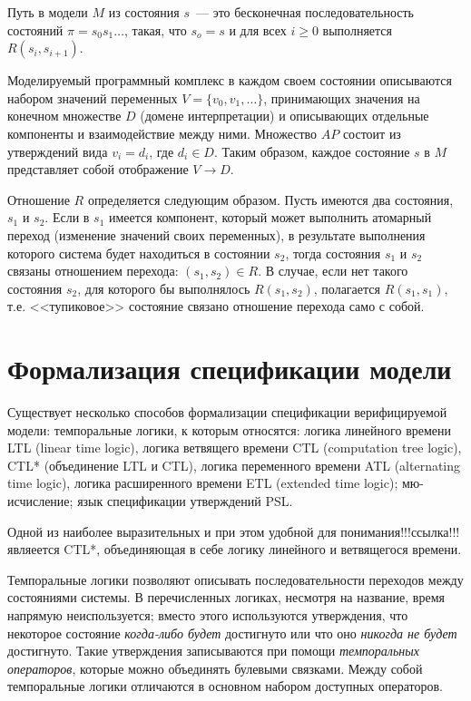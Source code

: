 \documentclass[a4paper,notitlepage,14pt]{article}
\begin{document}
Путь в модели $M$ из состояния $s$~--- это бесконечная последовательность состояний $\pi =
s_0 s_1 \ldots$, такая, что $s_o = s$ и для всех $i \geq 0$ выполняется $R(s_i, s_{i+1})$.

Моделируемый программный комплекс в каждом своем состоянии описываются набором значений
переменных $V = \{v_0, v_1, \ldots\}$, принимающих значения на конечном множестве $D$
(домене интерпретации) и описывающих отдельные компоненты и взаимодействие между
ними. Множество $AP$ состоит из утверждений вида $v_i = d_i$, где $d_i \in D$. Таким
образом, каждое состояние $s$ в $M$ представляет собой отображение $V \rightarrow D$.

Отношение $R$ определяется следующим образом. Пусть имеются два состояния, $s_1$ и
$s_2$. Если в $s_1$ имеется компонент, который может выполнить атомарный переход
(изменение значений своих переменных), в результате выполнения которого система будет
находиться в состоянии $s_2$, тогда состояния $s_1$ и $s_2$ связаны отношением перехода:
$(s_1, s_2) \in R$. В случае, если нет такого состояния $s_2$, для которого бы выполнялось
$R(s_1, s_2)$, полагается $R(s_1, s_1)$, т.е. <<тупиковое>> состояние связано отношение
перехода само с собой.

\section{Формализация спецификации модели}
\label{sec:specification}

Существует несколько способов формализации спецификации верифицируемой модели:
темпоральные логики, к которым относятся: логика линейного времени LTL (linear time
logic), логика ветвящего времени CTL (computation tree logic), CTL* (объединение LTL и
CTL), логика переменного времени ATL (alternating time logic), логика расширенного времени
ETL (extended time logic); мю-исчисление; язык спецификации утверждений PSL.

Одной из наиболее выразительных и при этом удобной для понимания!!!ссылка!!! являеется
CTL*, объединяющая в себе логику линейного и ветвящегося времени.

Темпоральные логики позволяют описывать последовательности переходов между состояниями
системы. В перечисленных логиках, несмотря на название, время напрямую неиспользуется;
вместо этого используются утверждения, что некоторое состояние \emph{когда-либо будет}
достигнуто или что оно \emph{никогда не будет} достигнуто. Такие утверждения записываются
при помощи \emph{темпоральных операторов}, которые можно объединять булевыми
связками. Между собой темпоральные логики отличаются в основном набором доступных
операторов.
\end{document}
